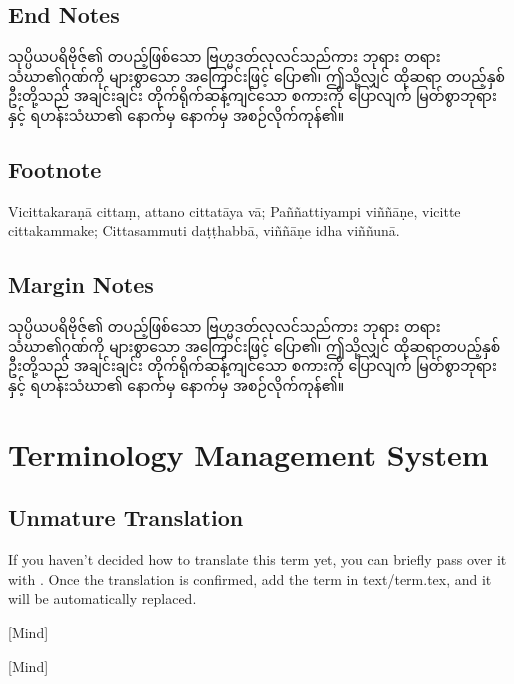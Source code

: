 \subsection{End Notes}
သုပ္ပိယပရိဗိုဇ်၏ တပည့်ဖြစ်သော ဗြဟ္မဒတ်လုလင်သည်ကား ဘုရား တရား သံဃာ၏ဂုဏ်ကို များစွာသော အကြောင်းဖြင့် ပြော၏၊ ဤသို့လျှင် ထိုဆရာ တပည့်နှစ်ဦးတို့သည် အချင်းချင်း တိုက်ရိုက်ဆန့်ကျင်သော စကားကို ပြောလျက် မြတ်စွာဘုရားနှင့် ရဟန်းသံဃာ၏ နောက်မှ နောက်မှ အစဉ်လိုက်ကုန်၏။

\subsection{Footnote}
Vicittakaraṇā cittaṃ, attano cittatāya vā;
Paññattiyampi viññāṇe, vicitte cittakammake;
Cittasammuti daṭṭhabbā, viññāṇe idha viññunā.


\subsection{Margin Notes}
သုပ္ပိယပရိဗိုဇ်၏ တပည့်ဖြစ်သော ဗြဟ္မဒတ်လုလင်သည်ကား ဘုရား တရား သံဃာ၏ဂုဏ်ကို များစွာသော အကြောင်းဖြင့် ပြော၏၊ ဤသို့လျှင် ထိုဆရာတပည့်နှစ်ဦးတို့သည် အချင်းချင်း တိုက်ရိုက်ဆန့်ကျင်သော စကားကို ပြောလျက် မြတ်စွာဘုရားနှင့် ရဟန်းသံဃာ၏ နောက်မှ နောက်မှ အစဉ်လိုက်ကုန်၏။

\section{Terminology Management System}
\subsection{Unmature Translation}
If you haven't decided how to translate this term yet, you can briefly pass over it with . Once the translation is confirmed, add the term in text/term.tex, and it will be automatically replaced.


[Mind]


[Mind]

